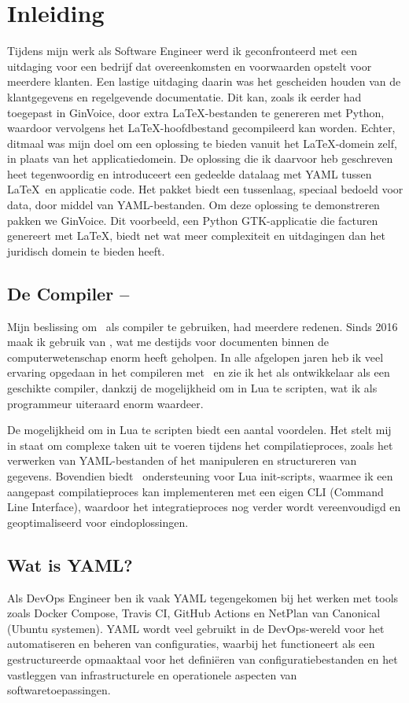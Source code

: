 \section{Inleiding}
Tijdens mijn werk als Software Engineer werd ik geconfronteerd met een uitdaging voor een bedrijf dat overeenkomsten en voorwaarden opstelt voor meerdere klanten.
Een lastige uitdaging daarin was het gescheiden houden van de klantgegevens en regelgevende documentatie.
Dit kan, zoals ik eerder had toegepast in GinVoice\cite{ginvoice}, door extra \LaTeX-bestanden te genereren met Python, waardoor vervolgens het \LaTeX-hoofdbestand gecompileerd kan worden.
Echter, ditmaal was mijn doel om een oplossing te bieden vanuit het \LaTeX-domein zelf, in plaats van het applicatiedomein.
De oplossing die ik daarvoor heb geschreven heet tegenwoordig \cite{lua-placeholders} en introduceert een gedeelde datalaag met YAML tussen \LaTeX\ en applicatie code.
Het pakket biedt een tussenlaag, speciaal bedoeld voor data, door middel van YAML-bestanden.
Om deze oplossing te demonstreren pakken we GinVoice.
Dit voorbeeld, een Python GTK-applicatie die facturen genereert met \LaTeX, biedt net wat meer complexiteit en uitdagingen dan het juridisch domein te bieden heeft.

\subsection{De Compiler -- \LuaLaTeX}
Mijn beslissing om \LuaLaTeX\ als compiler te gebruiken, had meerdere redenen.
Sinds 2016 maak ik gebruik van \LuaLaTeX, wat me destijds voor documenten binnen de computerwetenschap enorm heeft geholpen.
In alle afgelopen jaren heb ik veel ervaring opgedaan in het compileren met \LuaLaTeX\ en zie ik het als ontwikkelaar als een geschikte compiler, dankzij de mogelijkheid om in Lua te scripten, wat ik als programmeur uiteraard enorm waardeer.

De mogelijkheid om in Lua te scripten biedt een aantal voordelen.
Het stelt mij in staat om complexe taken uit te voeren tijdens het compilatieproces, zoals het verwerken van YAML-bestanden of het manipuleren en structureren van gegevens.
Bovendien biedt \LuaLaTeX\ ondersteuning voor Lua init-scripts, waarmee ik een aangepast compilatieproces kan implementeren met een eigen CLI (Command Line Interface), waardoor het integratieproces nog verder wordt vereenvoudigd en geoptimaliseerd voor eindoplossingen.

\subsection{Wat is YAML?}
Als DevOps Engineer ben ik vaak YAML tegengekomen bij het werken met tools zoals Docker Compose, Travis CI, GitHub Actions en NetPlan van Canonical (Ubuntu systemen).
YAML wordt veel gebruikt in de DevOps-wereld voor het automatiseren en beheren van configuraties, waarbij het functioneert als een gestructureerde opmaaktaal voor het definiëren van configuratiebestanden en het vastleggen van infrastructurele en operationele aspecten van softwaretoepassingen.

